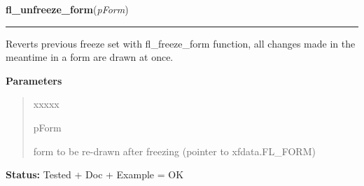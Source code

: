     \label{xformslib:library:fl_unfreeze_form}

    \vspace{0.5ex}

\hspace{.8\funcindent}\begin{boxedminipage}{\funcwidth}

    \raggedright \textbf{fl\_unfreeze\_form}(\textit{pForm})

    \vspace{-1.5ex}

    \rule{\textwidth}{0.5\fboxrule}
\setlength{\parskip}{2ex}
    Reverts previous freeze set with fl\_freeze\_form function, all changes
    made in the meantime in a form are drawn at once.

\setlength{\parskip}{1ex}
      \textbf{Parameters}
      \vspace{-1ex}

      \begin{quote}
        \begin{Ventry}{xxxxx}

          \item[pForm]

          form to be re-drawn after freezing (pointer to xfdata.FL\_FORM)

        \end{Ventry}

      \end{quote}

\textbf{Status:} Tested + Doc + Example = OK



    \end{boxedminipage}

    \label{xformslib:library:fl_deactivate_form}

    \vspace{0.5ex}

